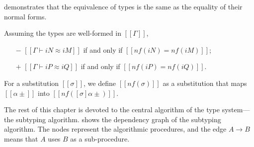 \documentclass[acmsmall,natbib=false,review,anonymous]{acmart}
\begin{document}
demonstrates that the equivalence of types is the same
as the equality of their normal forms.
\begin{theorempreview}
  Assuming the types are well-formed in $[[Γ]]$, 
  \begin{itemize}
    \item [$-$] $[[Γ ⊢ iN ≈ iM]]$ if and only if $[[nf(iN) = nf(iM)]]$;
    \item [$+$] $[[Γ ⊢ iP ≈ iQ]]$ if and only if $[[nf(iP) = nf(iQ)]]$.
  \end{itemize}
\end{theorempreview}



\begin{algorithm}
  For a substitution $[[σ]]$, we define $[[nf(σ)]]$
  as a substitution that maps $[[α±]]$ into $[[nf([σ]α±)]]$.
\end{algorithm}

The rest of this chapter is devoted to the
central algorithm of the type system---the subtyping algorithm. 
 shows the dependency graph of the subtyping algorithm.
The nodes represent the algorithmic procedures, and the edge $A \to B$ means that 
$A$ uses $B$ as a sub-procedure.
\end{document}
